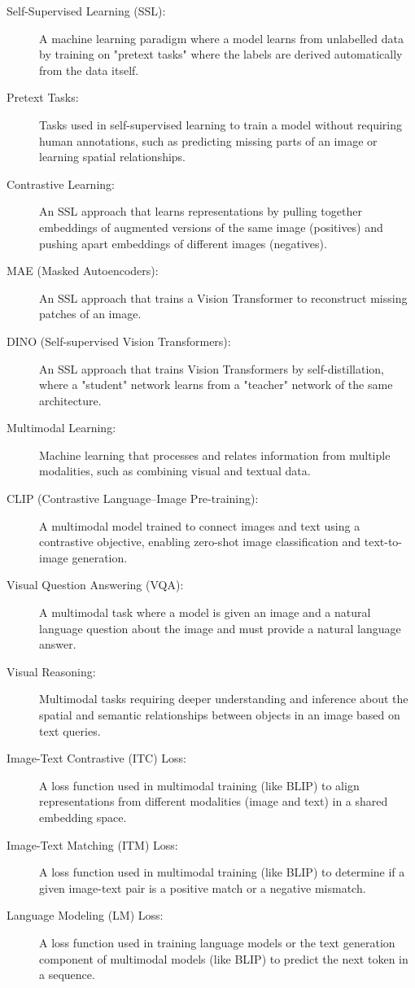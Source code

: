 \begin{description}
  \item[Self-Supervised Learning (SSL):] A machine learning paradigm where a model learns from unlabelled data by training on "pretext tasks" where the labels are derived automatically from the data itself.
  \item[Pretext Tasks:] Tasks used in self-supervised learning to train a model without requiring human annotations, such as predicting missing parts of an image or learning spatial relationships.
  \item[Contrastive Learning:] An SSL approach that learns representations by pulling together embeddings of augmented versions of the same image (positives) and pushing apart embeddings of different images (negatives).
  \item[MAE (Masked Autoencoders):] An SSL approach that trains a Vision Transformer to reconstruct missing patches of an image.
  \item[DINO (Self-supervised Vision Transformers):] An SSL approach that trains Vision Transformers by self-distillation, where a "student" network learns from a "teacher" network of the same architecture.
  \item[Multimodal Learning:] Machine learning that processes and relates information from multiple modalities, such as combining visual and textual data.
  \item[CLIP (Contrastive Language--Image Pre-training):] A multimodal model trained to connect images and text using a contrastive objective, enabling zero-shot image classification and text-to-image generation.
  \item[Visual Question Answering (VQA):] A multimodal task where a model is given an image and a natural language question about the image and must provide a natural language answer.
  \item[Visual Reasoning:] Multimodal tasks requiring deeper understanding and inference about the spatial and semantic relationships between objects in an image based on text queries.
  \item[Image-Text Contrastive (ITC) Loss:] A loss function used in multimodal training (like BLIP) to align representations from different modalities (image and text) in a shared embedding space.
  \item[Image-Text Matching (ITM) Loss:] A loss function used in multimodal training (like BLIP) to determine if a given image-text pair is a positive match or a negative mismatch.
  \item[Language Modeling (LM) Loss:] A loss function used in training language models or the text generation component of multimodal models (like BLIP) to predict the next token in a sequence.

\end{description}
